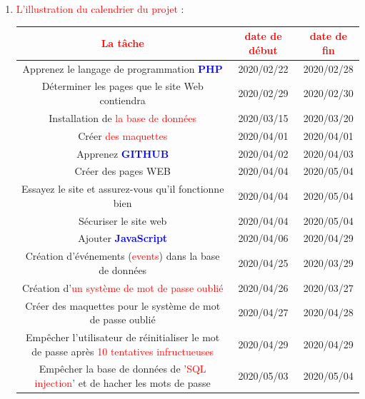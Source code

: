 \documentclass{article}
\begin{document}
\begin{enumerate}
\begin{enumerate}
    \end{enumerate}
   \item \textcolor{red}{\huge L'illustration du calendrier du projet} :  
   \vspace{1.2cm}
   
         \hspace*{-1.2in}
        \begin{tabular}{|c | c | c|}
        \hline
          \textcolor{red}{\Large La tâche} & \textcolor{red}{\Large date de début} & \textcolor{red}{\Large date de fin}\\ 
        \hline
        Apprenez le langage de programmation \textcolor{blue}{\textbf{PHP}} & 2020/02/22 & 2020/02/28 \\ 
        \hline
        Déterminer les pages que le site Web contiendra & 2020/02/29 & 2020/02/30 \\ 
        \hline
        Installation de \textcolor{red}{la base de données} & 2020/03/15 & 2020/03/20\\
        \hline
        Créer \textcolor{red}{des maquettes} & 2020/04/01  & 2020/04/01\\
        \hline
        Apprenez \textcolor{blue}{\textbf{GITHUB}} & 2020/04/02  & 2020/04/03\\
        \hline
        Créer des pages WEB & 2020/04/04  & 2020/05/04\\
        \hline
        Essayez le site et assurez-vous qu'il fonctionne bien & 2020/04/04  & 2020/05/04\\
		\hline        
        Sécuriser le site web & 2020/04/04  & 2020/05/04\\
        \hline
        Ajouter \textcolor{blue}{\textbf{JavaScript}} & 2020/04/06  & 2020/04/29\\
        \hline
        Création d'événements (\textcolor{red}{events}) dans la base de données & 2020/04/25 & 2020/03/29\\
        \hline
         Création d'\textcolor{red}{un système de mot de passe oublié} & 2020/04/26 & 2020/03/27\\
        \hline
        Créer des maquettes pour le système de mot de passe oublié & 2020/04/27  & 2020/04/28\\
        \hline
        Empêcher l'utilisateur de réinitialiser le mot de passe après \textcolor{red}{10 tentatives infructueuses} & 2020/04/29  & 2020/04/29\\
        \hline
        Empêcher la base de données de '\textcolor{red}{SQL injection}' et de hacher les mots de passe& 2020/05/03  & 2020/05/04\\
        \hline
        \end{tabular}
        

\end{enumerate}
\end{document}
